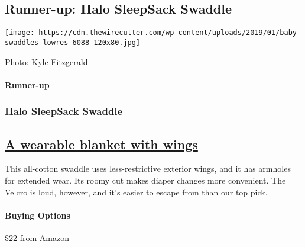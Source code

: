 \hypertarget{runner-up-halo-sleepsack-swaddle}{%
\subsection{Runner-up: Halo SleepSack
Swaddle}\label{runner-up-halo-sleepsack-swaddle}}

\texttt{[image: https://cdn.thewirecutter.com/wp-content/uploads/2019/01/baby-swaddles-lowres-6088-120x80.jpg]}

Photo: Kyle Fitzgerald

\hypertarget{runner-up-2}{%
\paragraph{Runner-up}\label{runner-up-2}}

\href{https://www.nytimes3xbfgragh.onion/wirecutter/out/link/30687/150978/4/86633?merchant=Amazon}{}

\hypertarget{halo-sleepsack-swaddle-2}{%
\subsubsection{\texorpdfstring{\href{https://www.nytimes3xbfgragh.onion/wirecutter/out/link/30687/150978/4/86633?merchant=Amazon}{Halo
SleepSack
Swaddle}}{Halo SleepSack Swaddle}}\label{halo-sleepsack-swaddle-2}}

\hypertarget{a-wearable-blanket-with-wings-2}{%
\subsection{\texorpdfstring{\href{https://www.nytimes3xbfgragh.onion/wirecutter/out/link/30687/150978/4/86633?merchant=Amazon}{A
wearable blanket with
wings}}{A wearable blanket with wings}}\label{a-wearable-blanket-with-wings-2}}

This all-cotton swaddle uses less-restrictive exterior wings, and it has
armholes for extended wear. Its roomy cut makes diaper changes more
convenient. The Velcro is loud, however, and it's easier to escape from
than our top pick.

\hypertarget{buying-options-7}{%
\paragraph{Buying Options}\label{buying-options-7}}

\href{https://www.nytimes3xbfgragh.onion/wirecutter/out/link/30687/150978/4/86633?merchant=Amazon}{\$22
from Amazon}

